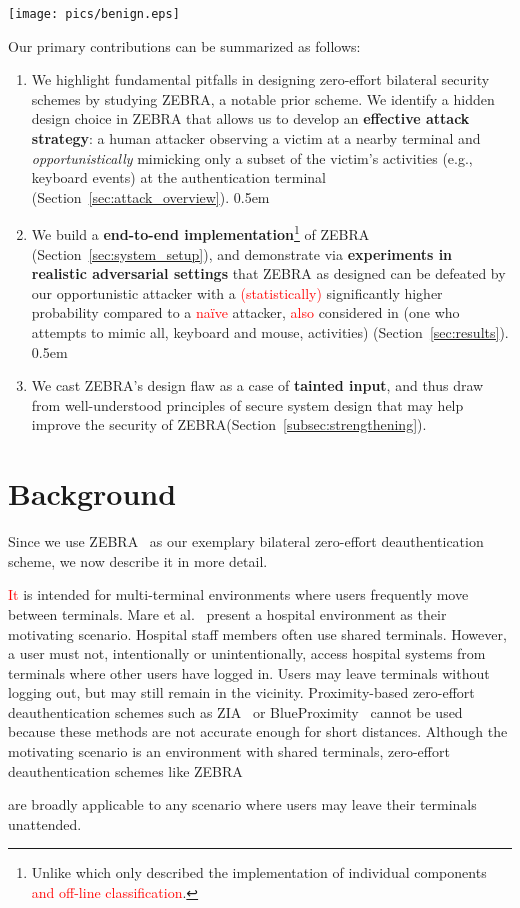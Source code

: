 \documentclass[conference]{IEEEtran}
\newcommand{\zebra}{ZEBRA\xspace}
\newif\ifabridged
\newcommand\changeMika[1]{\textcolor{red}{#1}}
\newcommand\changeAsokan[1]{\textcolor{red}{#1}}
\newcommand\changeMika[1]{{#1}}
\newcommand\changeAsokan[1]{{#1}}
\begin{document}
\begin{figure*}[!bht]
\centering
\texttt{[image: pics/benign.eps]}
\caption{Normal operation of \zebra}
\label{fig:benign}
\end{figure*}

Our primary contributions can be summarized as follows:
\begin{enumerate}
\itemsep0em
\item 
We highlight fundamental pitfalls in designing zero-effort bilateral
security schemes by studying \zebra, a notable prior scheme. We 
identify a hidden design choice in \zebra that allows us to develop an \textbf{effective attack strategy}: a human attacker observing a victim at a nearby terminal and \textit{opportunistically} mimicking only a subset of the victim's activities (e.g., keyboard events) at the authentication terminal (Section~\ref{sec:attack_overview}).
\itemsep0.5em
\item  We build a \textbf{end-to-end
    implementation}\footnote{Unlike \cite{mare2014zebra} which only
    described the implementation of individual components \changeAsokan{and off-line classification}.} of \zebra
  (Section~\ref{sec:system_setup}), and demonstrate via \textbf{experiments in
  realistic adversarial settings} that \zebra as designed can be
  defeated by our opportunistic attacker with a \changeMika{(statistically)} significantly higher probability compared to a \changeAsokan{na\"{i}ve} attacker, \changeMika{also} considered in \cite{mare2014zebra} (one who attempts to mimic all, keyboard and mouse, activities) (Section~\ref{sec:results}).
\itemsep0.5em
\item We cast \zebra's design flaw as a case of
  \textbf{tainted input}, and thus draw from well-understood principles
  of secure system design that may help improve the security of \zebra (Section~\ref{subsec:strengthening}).
\end{enumerate}
 
\section{Background}
\label{sec:background}

\ifabridged
\else
Since we use \zebra~\cite{mare2014zebra} as our exemplary bilateral
zero-effort deauthentication scheme, we now describe it in more
detail. 
\fi
\changeAsokan{It} is intended for multi-terminal environments where users frequently move between terminals. Mare et al.~\cite{mare2014zebra} present a hospital environment as their motivating scenario. Hospital staff members often use shared terminals. However, a user must not, intentionally or unintentionally, access hospital systems from terminals where other users have logged in. Users may leave terminals without logging out, but may still remain in the vicinity. Proximity-based zero-effort deauthentication schemes such as ZIA~\cite{CN02} or BlueProximity~\cite{Blueproximity} cannot be used because these methods are not accurate enough for short distances. Although the motivating scenario is an environment with shared terminals, zero-effort deauthentication schemes \ifabridged
\else
like \zebra
\fi
are broadly applicable to any scenario where users may leave their terminals unattended.
\end{document}
